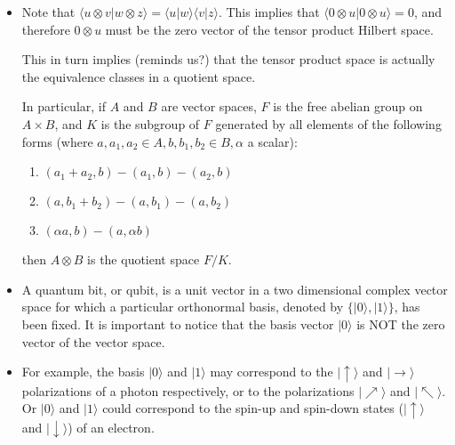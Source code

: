 \documentclass{article}
\def\pagedone{\newpage}
\def\ket#1{|{#1}\rangle}
\def\braket#1#2{\langle{#1}|{#2}\rangle}
\def\tensor{\otimes}
\begin{document}
\pagedone
\begin{itemize}
	\item Note that $\braket {u \tensor v} {w \tensor z} = \braket uw \braket vz$.  
	This implies that $\braket {0 \tensor u} {0 \tensor u} = 0$, and therefore $0 \tensor u$ must
	be the zero vector of the tensor product Hilbert space.
	
	This in turn implies (reminds us?) that the tensor product space is actually the equivalence
	classes in a quotient space.
	
	In particular, if $A$ and $B$ are vector spaces, $F$ is the free abelian group on $A\times B$,
	and $K$ is the subgroup of $F$ generated by all elements of the following forms (where \newline	
	$a, a_1, a_2\in A, b, b_1, b_2\in B, \alpha$ a scalar):
	\begin{enumerate}
		\item $(a_1 + a_2,b) - (a_1,b) - (a_2,b)$
		\item $(a,b_1 + b_2) - (a,b_1) - (a,b_2)$
		\item $(\alpha a,b) - (a,\alpha b)$
	\end{enumerate}
	then $A\tensor B$ is the quotient space $F/K$.
	 
\end{itemize}



\pagedone



\begin{itemize}
	\item A quantum bit, or qubit, is a unit vector in a two dimensional
complex vector space for which a particular orthonormal basis, denoted by
$\{\ket 0, \ket 1\}$, 
has been fixed. It is important to notice that the basis vector $\ket 0$ is NOT the zero vector of the vector space.
\item For example, the basis
$\ket 0$ and $\ket 1$ may correspond to the $\ket{\uparrow}$ and 
$\ket{\to}$ polarizations of a photon respectively, or to the polarizations
$\ket{\nearrow}$ and $\ket{\nwarrow}$. Or $\ket 0$ and $\ket 1$ could 
correspond to the spin-up and spin-down states ($\ket{\uparrow}$ and $\ket{\downarrow}$) of an electron.
\end{itemize}
\end{document}
